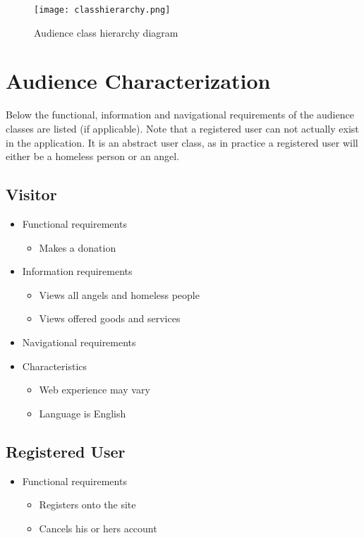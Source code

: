 \documentclass[a4paper]{report}
\begin{document}
\begin{figure}[htp]
\centering
\texttt{[image: classhierarchy.png]}
\caption{Audience class hierarchy diagram}
\label{fig:classhierarchy}
\end{figure}

\section{Audience Characterization}
Below the functional, information and navigational requirements of the audience classes are listed (if applicable). Note that a registered user can not actually exist in the application. It is an abstract user class, as in practice a registered user will either be a homeless person or an angel.

\subsection{Visitor}
\begin{itemize}
	\item Functional requirements
	\begin{itemize}
		\item Makes a donation
	\end{itemize}
	\item Information requirements
	\begin{itemize}
		\item Views all angels and homeless people
		\item Views offered goods and services
	\end{itemize}
	\item Navigational requirements
	\item Characteristics
	\begin{itemize}
		\item Web experience may vary
		\item Language is English
	\end{itemize}
\end{itemize}

\subsection{Registered User}
\begin{itemize}
	\item Functional requirements
	\begin{itemize}
		\item Registers onto the site
		\item Cancels his or hers account
	\end{itemize}
\end{itemize}
\end{document}
